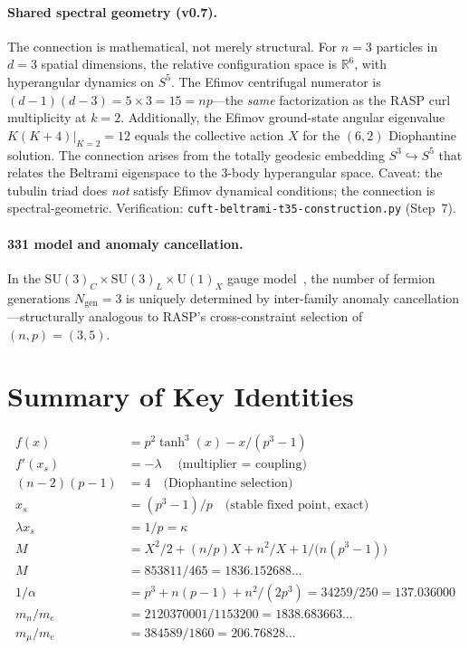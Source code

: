 \documentclass[12pt,a4paper]{article}
\theoremstyle{definition}
\begin{document}
\paragraph{Shared spectral geometry (v0.7).}
The connection is mathematical, not merely structural. For $n{=}3$
particles in $d{=}3$ spatial dimensions, the relative configuration space
is $\mathbb{R}^6$, with hyperangular dynamics on $S^5$. The Efimov
centrifugal numerator is $(d{-}1)(d{-}3) = 5 \times 3 = 15 = np$---the
\emph{same} factorization as the RASP curl multiplicity at $k{=}2$.
Additionally, the Efimov ground-state angular eigenvalue $K(K{+}4)|_{K=2}
= 12$ equals the collective action $X$ for the $(6,2)$ Diophantine
solution. The connection arises from the totally geodesic embedding
$S^3 \hookrightarrow S^5$ that relates the Beltrami eigenspace to the
3-body hyperangular space. Caveat: the tubulin triad does \emph{not}
satisfy Efimov dynamical conditions; the connection is spectral-geometric.
Verification: \texttt{cuft-beltrami-t35-construction.py} (Step~7).

\paragraph{331 model and anomaly cancellation.}
In the $\mathrm{SU}(3)_C \times \mathrm{SU}(3)_L \times \mathrm{U}(1)_X$
gauge model~\cite{pisano1992,frampton1992}, the number of fermion
generations $N_\mathrm{gen} = 3$ is uniquely determined by inter-family
anomaly cancellation---structurally analogous to RASP's cross-constraint
selection of $(n,p) = (3,5)$.

\section{Summary of Key Identities}

\begin{align*}
  f(x) &= p^2 \tanh^3(x) - x/(p^3-1) \\
  f'(x_s) &= -\lambda \quad\text{(multiplier $=$ coupling)} \\
  (n-2)(p-1) &= 4 \quad\text{(Diophantine selection)} \\
  x_s &= (p^3-1)/p \quad\text{(stable fixed point, exact)} \\
  \lambda x_s &= 1/p = \kappa \\
  M &= X^2/2 + (n/p)X + n^2/X + 1/\bigl(n(p^3-1)\bigr) \\
  M &= 853811/465 = 1836.152688\ldots \\
  1/\alpha &= p^3 + n(p-1) + n^2/(2p^3) = 34259/250 = 137.036000 \\
  m_n/m_e &= 2120370001/1153200 = 1838.683663\ldots \\
  m_\mu/m_e &= 384589/1860 = 206.76828\ldots
\end{align*}
\end{document}

